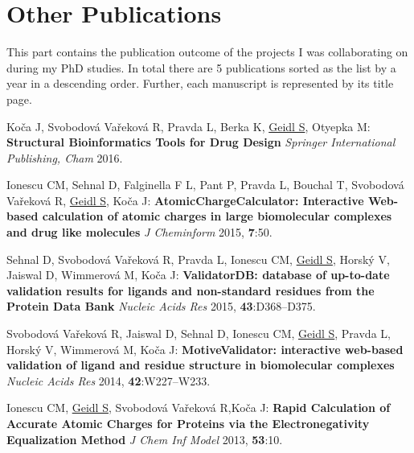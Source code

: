 \chapter{Other Publications}
\label{chapter:publications}

This part contains the publication outcome of the projects I was collaborating
on during my PhD studies. In total there are 5 publications sorted as the list
by a year in a descending order. Further, each manuscript is represented by
its title page.

\vspace{5mm}

Koča J, Svobodová Vařeková R, Pravda L, Berka K, \underline{Geidl S}, Otyepka M:
\textbf{Structural Bioinformatics Tools for Drug Design}
\textit{Springer International Publishing, Cham} 2016.

\vspace{5mm}

Ionescu CM, Sehnal D, Falginella F L, Pant P, Pravda L, Bouchal T,
Svobodová Vařeková R, \underline{Geidl S}, Koča J: 
\textbf{AtomicChargeCalculator: Interactive Web-based calculation of atomic
charges in large biomolecular complexes and drug like molecules}
\textit{J Cheminform} 2015, \textbf{7}:50.

\vspace{5mm}

Sehnal D, Svobodová Vařeková R, Pravda L, Ionescu CM, \underline{Geidl S},
Horský V, Jaiswal D, Wimmerová M, Koča J: \textbf{ValidatorDB: database of up-to-date
validation results for ligands and non-standard residues from the Protein Data Bank}
\textit{Nucleic Acids Res} 2015, \textbf{43}:D368--D375.

\vspace{5mm}

Svobodová Vařeková R, Jaiswal D, Sehnal D, Ionescu CM, \underline{Geidl S},
Pravda L, Horský V, Wimmerová M, Koča J: \textbf{MotiveValidator: interactive
web-based validation of ligand and residue structure in biomolecular complexes}
\textit{Nucleic Acids Res} 2014, \textbf{42}:W227--W233.


\vspace{5mm}

Ionescu CM, \underline{Geidl S}, Svobodová Vařeková R,Koča J: \textbf{Rapid Calculation
of Accurate Atomic Charges for Proteins via the Electronegativity Equalization Method}
\textit{J Chem Inf Model} 2013, \textbf{53}:10.


\clearpage

